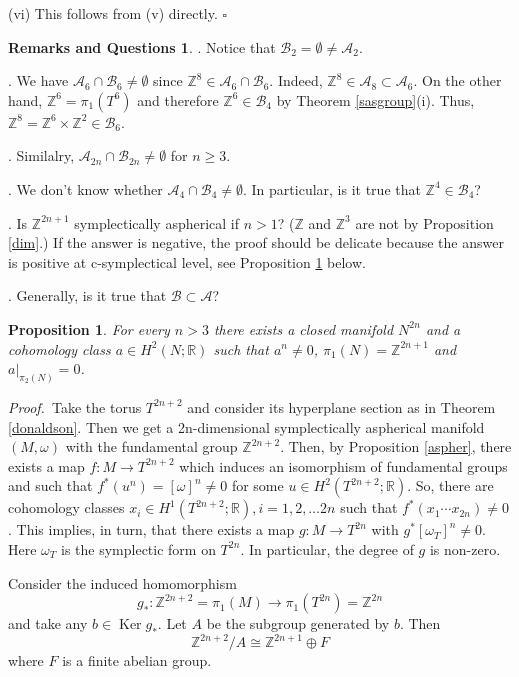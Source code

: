 \documentclass[12pt, twoside]{amsart}
\theoremstyle{plain}
\newtheorem{prop}[theorem]{Proposition}
\theoremstyle{definition}
\newtheorem{remque}[theorem]{Remarks and Questions}
\numberwithin{equation}{section}
\def\RR{\mathbb R}
\def\ZZ{\mathbb Z}
\def\Ker{\operatorname {Ker}}
\def\hqed{\hfill\hfill$\square$}
\def\AAA{{\mathcal A}}
\def\BBB{{\mathcal B}}
\def\RR{\mathbb R}
\def\ZZ{\mathbb Z}
\def\m{\medskip}
\def\p{{\it Proof.\ }}
\begin{document}
\par (vi) This follows from (v) directly.
\hqed

\begin{remque}\rm 
\m 1. Notice that $\BBB_2=\emptyset \ne \AAA_2$.  

\m 2. We have $\AAA_6 \cap \BBB_6 \ne \emptyset$ since $\ZZ^{8} \in \AAA_6\cap 
\BBB_6$. Indeed,  $\ZZ^{8}\in
\AAA_{8} \subset \AAA_6$. On the other hand, $\ZZ^6 =\pi_1(T^6)$ and therefore 
$\ZZ^{6}\in \BBB_{4}$ by Theorem \ref{sasgroup}(i). Thus, $\ZZ^8 =\ZZ^6 \times 
\ZZ^2 
\in \BBB_6$. 

\m 3. Similalry, $\AAA_{2n} \cap \BBB_{2n} \ne \emptyset$ for
$n\ge 3$. 

\m 4. We don't know whether $\AAA_4 \cap \BBB_4 \ne \emptyset$. In
particular, is it true that $\ZZ^4 \in \BBB_4$?    

\m 5. Is $\ZZ^{2n+1}$ symplectically aspherical if $n>1$? ($\ZZ$ and $\ZZ^3$ 
are
not by Proposition \ref{dim}.) If the answer is negative, the proof should be 
delicate because the answer is positive at c-symplectical level, see 
Proposition \ref{zz} below.

\m 6. Generally, is it true that $\BBB \subset \AAA$?
\end{remque}

\begin{prop}\label{zz}
For every $n>3$ there exists a closed manifold $N^{2n}$ and a cohomology class 
$a\in 
H^2(N;\RR)$ such that $a^n\ne 0$, $\pi_1(N)=\ZZ^{2n+1}$ and $a|_{\pi_2(N)}=0$.
\end{prop}

\p Take the torus $T^{2n+2}$ and consider its hyperplane section as in Theorem
\ref{donaldson}. Then we get a 2n-dimensional symplectically aspherical 
manifold 
$(M,\omega)$ with the fundamental group $\ZZ^{2n+2}$. Then, by Proposition 
\ref{aspher}, there exists a  map $f: M\to T^{2n+2}$ which induces an 
isomorphism of fundamental groups and such that $f^*(u^{n})=[\omega]^n\ne 0$ 
for 
some $u\in H^2(T^{2n+2};\RR)$. So, there are cohomology classes $x_i\in 
H^1(T^{2n+2};\RR), i=1,2, \ldots 2n$ such that $f^*(x_1 \cdots x_{2n})\ne 0$. 
This implies, in  turn, that there exists a map $g: M \to T^{2n}$ with 
$g^*[\omega_T]^n\ne 0$. Here $\omega_T$ is the symplectic form on $T^{2n}$. In 
particular, the degree of $g$ is 
non-zero. 

\m
Consider the induced homomorphism 
$$
g_*:\ZZ^{2n+2}=\pi_1(M) \to  \pi_1(T^{2n})=\ZZ^{2n}
$$ 
and take any $b\in \Ker g_*$. Let $A$ be the subgroup generated by $b$. Then 
$$
\ZZ^{2n+2}/A \cong \ZZ^{2n+1} \oplus F
$$ 
where $F$ is a finite abelian group.
\end{document}
